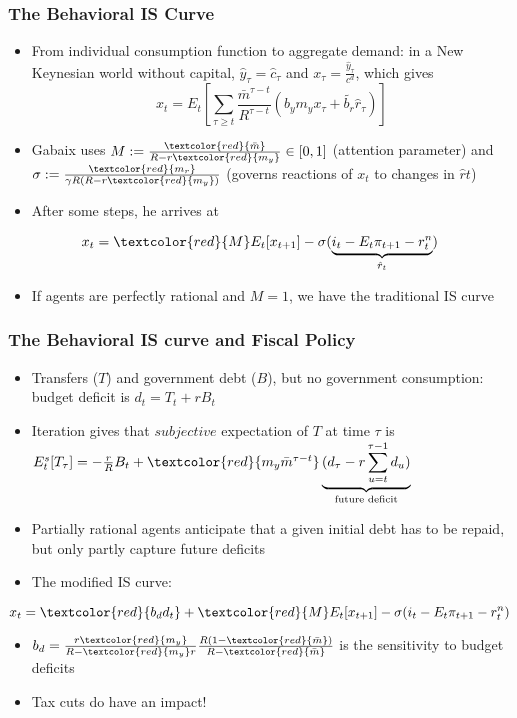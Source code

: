\documentclass{beamer}
\begin{document}
\begin{frame}
	\frametitle{The Behavioral IS Curve}
	\begin{itemize}
		\item From individual consumption function to aggregate demand: in a New Keynesian world without capital, $\hat y_{\tau}=\hat c_{\tau}$ and $x_{\tau}=\frac {\hat y_{\tau}}{c^{d}}$, which gives
	$$x_{t}=E_{t}[\sum_{\tau \geq t}\frac{\bar m^{\tau-t}}{R^{\tau-t}}(b_{y}m_{y}x_{\tau}+\tilde{b_{r}}\hat r_{\tau})]$$
		\item Gabaix uses $M:=\frac{\textcolor{red}{\bar m}}{R-r\textcolor{red}{m_{y}}}\in [0,1]$ (attention parameter) and $\sigma:=\frac{\textcolor{red}{m_{r}}}{\gamma R(R-r\textcolor{red}{m_{y}})}$ (governs reactions of $x_{t}$ to changes in $\hat r{t}$)
		\item After some steps, he arrives at
	\end{itemize}

	$$x_{t}=\textcolor{red}{M}E_{t}[x_{t+1}]-\sigma(\underbrace{i_{t}-E_{t}\pi_{t+1}-r_{t}^{n}}_\text{$\hat r_{t}$})$$

	\begin{itemize}
		\item If agents are perfectly rational and $M=1$, we have the traditional IS curve
	\end{itemize}
\end{frame}


\begin{frame}
	\frametitle{The Behavioral IS curve and Fiscal Policy}
	\begin{itemize}
		\item Transfers ($T$) and government debt ($B$), but no government consumption: budget deficit is $d_ {t}=T_{t}+rB_{t}$
		\item Iteration gives that $subjective$ expectation of $T$ at time $\tau$ is $E_{t}^{s}[T_{\tau}] = -\frac {r}{R}B_{t} + \textcolor{red}{m_{y}\bar m^{\tau-t}}\underbrace{(d_{\tau}-r \sum_{u=t}^{\tau-1}d_{u})}_\text{future deficit}$
		\item Partially rational agents anticipate that a given initial debt has to be repaid, but only partly capture future deficits
		\item The modified IS curve:

	\end{itemize}
	$$x_{t}=\textcolor{red}{b_{d}d_{t}}+\textcolor{red}{M}E_{t}[x_{t+1}]-\sigma(i_{t}-E_{t}\pi_{t+1}-r_{t}^{n})$$
	\begin{itemize}
		 \item $b_{d}=\frac {r\textcolor{red}{m_{y}}}{R-\textcolor{red}{m_{y}}r}\frac {R(1-\textcolor{red}{\bar m})}{R-\textcolor{red}{\bar m}}$ is the sensitivity to budget deficits
		 \item Tax cuts do have an impact!
	\end{itemize}
\end{frame}
\end{document}
